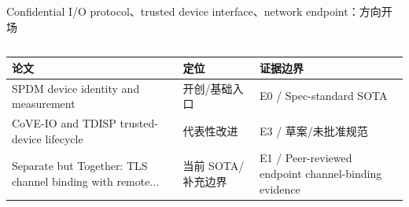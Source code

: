 \begin{frame}[t,shrink=6]{Confidential I/O protocol、trusted device interface、network endpoint：方向开场}
\begin{columns}[T,totalwidth=\textwidth]
\begin{column}{0.49\textwidth}
{\begin{minipage}[t]{0.97\linewidth}
\begin{minipage}{0.92\linewidth}
{\begin{tabularx}{\linewidth}{@{}YYY@{}}
\toprule
\textbf{论文} & \textbf{定位} & \textbf{证据边界} \\
\midrule
SPDM device identity and measurement & 开创/基础入口 & E0 / Spec-standard SOTA \\
CoVE-IO and TDISP trusted-device lifecycle & 代表性改进 & E3 / 草案/未批准规范 \\
Separate but Together: TLS channel binding with remote... & 当前 SOTA/补充边界 & E1 / Peer-reviewed endpoint channel-binding evidence \\
\bottomrule
\end{tabularx}
}
    \end{minipage}
    \vspace{1mm}
  \end{minipage}}
  \end{column}
\end{columns}
\end{frame}



